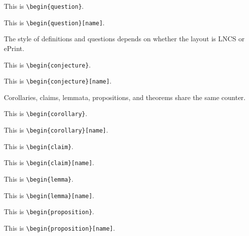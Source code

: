 \begin{question}
This is \texttt{\textbackslash begin\{question\}}.
\end{question}

\begin{question}[name]
This is \texttt{\textbackslash begin\{question\}[name]}.
\end{question}

\noindent
The style of definitions and questions depends on
whether the layout is LNCS or ePrint.

\begin{conjecture}
This is \texttt{\textbackslash begin\{conjecture\}}.
\end{conjecture}

\begin{conjecture}[name]
This is \texttt{\textbackslash begin\{conjecture\}[name]}.
\end{conjecture}

\noindent
Corollaries, claims, lemmata, propositions, and theorems
share the same counter.

\begin{corollary}
This is \texttt{\textbackslash begin\{corollary\}}.
\end{corollary}

\begin{corollary}[name]
This is \texttt{\textbackslash begin\{corollary\}[name]}.
\end{corollary}

\begin{claim}
This is \texttt{\textbackslash begin\{claim\}}.
\end{claim}

\begin{claim}[name]
This is \texttt{\textbackslash begin\{claim\}[name]}.
\end{claim}

\begin{lemma}\label{lem:lemma5}
This is \texttt{\textbackslash begin\{lemma\}}.
\end{lemma}

\begin{lemma}[name]
This is \texttt{\textbackslash begin\{lemma\}[name]}.
\end{lemma}

\begin{proposition}
This is \texttt{\textbackslash begin\{proposition\}}.
\end{proposition}

\begin{proposition}[name]
This is \texttt{\textbackslash begin\{proposition\}[name]}.
\end{proposition}

